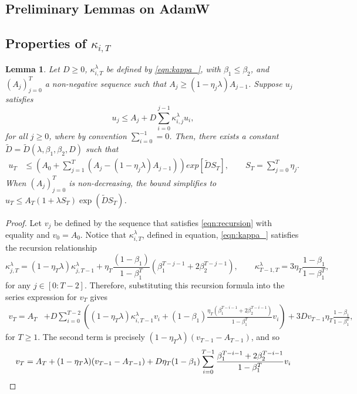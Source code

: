 \documentclass{article}
\newtheorem{lemma}[theorem]{Lemma}
\begin{document}
\begin{appendices}
\section{Preliminary Lemmas on AdamW}\label{App:K}
\subsection{Properties of $\kappa_{i,T}$}
\begin{lemma}\label{lemma:RecursiveSum}
Let $D\ge0$,  $\kappa^\lambda_{i,T}$ be defined by \eqref{eqn:kappa_}, with $\beta_1\le \beta_2$, and $(A_j)_{j=0}^T$ a non-negative sequence such that $A_j\ge(1-\eta_j\lambda)A_{j-1}$. Suppose $u_j$ satisfies 
    \begin{equation}\label{eqn:recursion}
            u_j \le A_j+D\sum_{i=0}^{j-1}\kappa^\lambda_{i,j}u_i, 
    \end{equation}
for all $j\ge 0$, where by convention $\sum_{i=0}^{-1}=0$. Then, there exists a constant $\widetilde D=\widetilde D(\lambda,\beta_1,\beta_2,D)$ such that
 \begin{align}\label{eqn:cgamma}
  u_T &\le \left(A_0+\sum_{j=1}^T\left(A_j-(1-\eta_j\lambda)A_{j-1}\right)\right)exp\left[\widetilde DS_T\right],\qquad S_T=\sum_{j=0}^T\eta_j.
 \end{align}
 When $(A_j)^T_{j=0}$ is non-decreasing, the bound simplifies to $u_T\le A_T(1+\lambda S_T)\exp(\widetilde{D}S_T)$.
\end{lemma}
\begin{proof}
Let $v_j$ be defined by the sequence that satisfies \eqref{eqn:recursion} with equality and $v_0=A_0$.  Notice that $\kappa^\lambda_{i,T}$, defined in equation, \eqref{eqn:kappa_} satisfies the recursion relationship
\[
\kappa^\lambda_{j,T} = (1-\eta_T\lambda)\kappa^\lambda_{j,T-1}+\eta_T\frac{(1-\beta_1)}{1-\beta_1^{T}}(\beta_1^{T-j-1}+2\beta_2^{T-j-1}),\qquad \kappa^\lambda_{T-1,T} = 3\eta_{T} \frac{1-\beta_1}{1-\beta_1^{T}}, 
\]
for any $j\in[0:T-2]$. Therefore, substituting this recursion formula into the series expression for $v_T$ gives
\begin{align*}
v_T = A_T&+ D\sum_{i=0}^{T-2}\left((1-\eta_T\lambda)\kappa^\lambda_{i,T-1}v_i+(1-\beta_1)\frac{\eta_T(\beta_1^{T-i-1}+2\beta_2^{T-i-1})}{1-\beta_1^T}v_i \right)+ 3Dv_{T-1}\eta_T\frac{1-\beta_1 }{1-\beta_1^T},
\end{align*}
for $T\ge 1$. The second term is precisely $(1-\eta_T\lambda)(v_{T-1}-A_{T-1})$, and so 
\begin{align}
    v_T&=A_T+ (1-\eta_T\lambda)(v_{T-1}-A_{T-1})+ D\eta_T (1-\beta_1)\sum_{i=0}^{T-1}\frac{\beta_1^{T-i-1}+2\beta_2^{T-i-1}}{1-\beta_1^T}v_i\notag\\

\end{align}
\end{proof}
\end{appendices}
\end{document}
